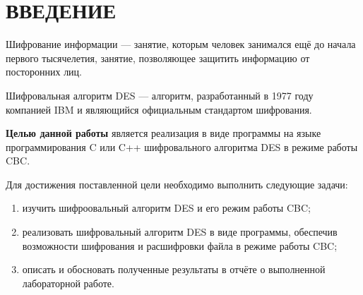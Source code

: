 \chapter*{ВВЕДЕНИЕ}

Шифрование информации --- занятие, которым человек занимался ещё до начала первого тысячелетия, занятие, позволяющее защитить информацию от посторонних лиц. 

Шифровальная алгоритм DES --- алгоритм, разработанный в 1977 году компанией IBM и являющийся официальным стандартом шифрования.

\textbf{Целью данной работы} является реализация в виде программы на языке программирования C или C++ шифровального алгоритма DES в режиме работы CBC. 

Для достижения поставленной цели необходимо выполнить следующие задачи:
\begin{enumerate}[label=\arabic*)]
	\item изучить шифроовальный алгоритм  DES и его режим работы CBC;
	\item реализовать шифровальный алгоритм DES в виде программы, обеспечив возможности шифрования и расшифровки файла в режиме работы CBC;
	\item описать и обосновать полученные результаты в отчёте о выполненной лабораторной работе.
\end{enumerate}
